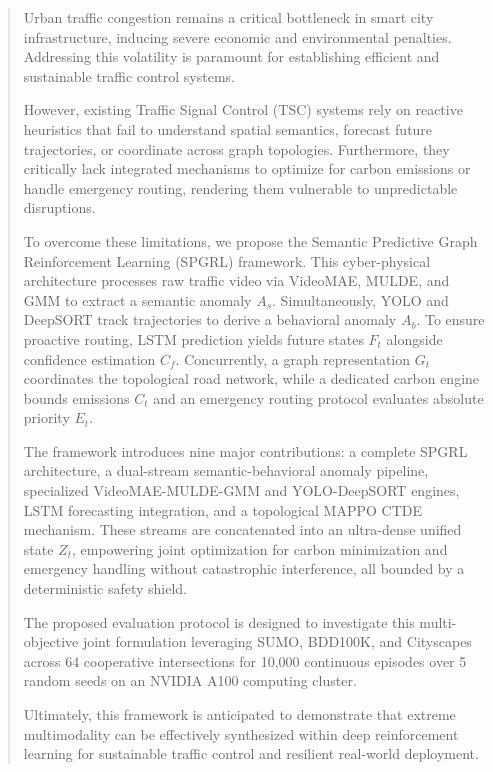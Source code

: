 \begin{abstract}
Urban traffic congestion remains a critical bottleneck in smart city infrastructure, inducing severe economic and environmental penalties. Addressing this volatility is paramount for establishing efficient and sustainable traffic control systems.

However, existing Traffic Signal Control (TSC) systems rely on reactive heuristics that fail to understand spatial semantics, forecast future trajectories, or coordinate across graph topologies. Furthermore, they critically lack integrated mechanisms to optimize for carbon emissions or handle emergency routing, rendering them vulnerable to unpredictable disruptions.

To overcome these limitations, we propose the Semantic Predictive Graph Reinforcement Learning (SPGRL) framework. This cyber-physical architecture processes raw traffic video via VideoMAE, MULDE, and GMM to extract a semantic anomaly $A_s$. Simultaneously, YOLO and DeepSORT track trajectories to derive a behavioral anomaly $A_b$. To ensure proactive routing, LSTM prediction yields future states $F_t$ alongside confidence estimation $C_f$. Concurrently, a graph representation $G_t$ coordinates the topological road network, while a dedicated carbon engine bounds emissions $C_t$ and an emergency routing protocol evaluates absolute priority $E_t$.

The framework introduces nine major contributions: a complete SPGRL architecture, a dual-stream semantic-behavioral anomaly pipeline, specialized VideoMAE-MULDE-GMM and YOLO-DeepSORT engines, LSTM forecasting integration, and a topological MAPPO CTDE mechanism. These streams are concatenated into an ultra-dense unified state $Z_t$, empowering joint optimization for carbon minimization and emergency handling without catastrophic interference, all bounded by a deterministic safety shield.

The proposed evaluation protocol is designed to investigate this multi-objective joint formulation leveraging SUMO, BDD100K, and Cityscapes across 64 cooperative intersections for 10,000 continuous episodes over 5 random seeds on an NVIDIA A100 computing cluster. 

Ultimately, this framework is anticipated to demonstrate that extreme multimodality can be effectively synthesized within deep reinforcement learning for sustainable traffic control and resilient real-world deployment.
\end{abstract}
